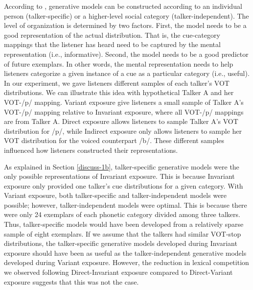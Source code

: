 \documentclass[preprint, 3p, authoryear]{elsarticle} %
\begin{document}
According to \citet{kleinschmidt2019}, generative models can be constructed according to an individual person (talker-specific) or a higher-level social category (talker-independent).
The level of organization is determined by two factors.
First, the model needs to be a good representation of the actual distribution.
That is, the cue-category mappings that the listener has heard need to be captured by the mental representation (i.e., informative).
Second, the model needs to be a good predictor of future exemplars.
In other words, the mental representation needs to help listeners categorize a given instance of a cue as a particular category (i.e., useful).
In our experiment, we gave listeners different samples of each talker's VOT distributions.
We can illustrate this idea with hypothetical Talker A and her VOT-/p/ mapping.
Variant exposure give listeners a small sample of Talker A's VOT-/p/ mapping relative to Invariant exposure, where all VOT-/p/ mappings are from Talker A.
Direct exposure allows listeners to sample Talker A's VOT distribution for /p/, while Indirect exposure only allows listeners to sample her VOT distribution for the voiced counterpart /b/.
These different samples influenced how listeners constructed their representations.

As explained in Section \ref{discuss-1b}, talker-specific generative models were the only possible representations of Invariant exposure.
This is because Invariant exposure only provided one talker's cue distributions for a given category.
With Variant exposure, both talker-specific and talker-independent models were possible; however, talker-independent models were optimal.
This is because there were only 24 exemplars of each phonetic category divided among three talkers.
Thus, talker-specific models would have been developed from a relatively sparse sample of eight exemplars.
If we assume that the talkers had similar VOT-stop distributions, the talker-specific generative models developed during Invariant exposure should have been as useful as the talker-independent generative models developed during Variant exposure.
However, the reduction in lexical competition we observed following Direct-Invariant exposure compared to Direct-Variant exposure suggests that this was not the case.
\end{document}
